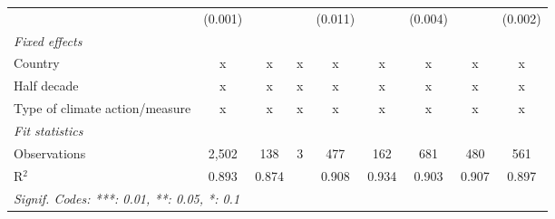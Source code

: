 \begin{table}[htbp]
\begin{tabular}{lcccccccc}
                                                                       & (0.001)       &                           &              & (0.011)        &                  & (0.004)         &                 & (0.002)\\   
      \emph{Fixed effects}\\
      Country                                                          & x             & x                         & x            & x              & x                & x               & x               & x\\  
      Half decade                                                      & x             & x                         & x            & x              & x                & x               & x               & x\\  
      Type of climate action/measure                                   & x             & x                         & x            & x              & x                & x               & x               & x\\  
      \midrule \emph{Fit statistics}\\
      Observations                                                     & 2,502         & 138                       & 3            & 477            & 162              & 681             & 480             & 561\\  
      R$^2$                                                            & 0.893         & 0.874                     &              & 0.908          & 0.934            & 0.903           & 0.907           & 0.897\\  
      \midrule
      \multicolumn{9}{l}{\emph{Signif. Codes: ***: 0.01, **: 0.05, *: 0.1}}\\
   \end{tabular}
\end{table}


